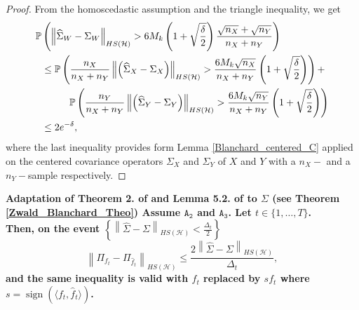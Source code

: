 \documentclass[twoside,11pt]{article}
\newcommand{\HSk}{HS(\mathcal{H})}
\newcommand{\PPO}{\mathbb{P} }
\newcommand{\SW}{\Sigma}
\newcommand{\hS}{\widehat{\Sigma}}
\newcommand{\A}[1]{$\mathtt{A_#1}$}
\DeclareMathOperator{\sign}{sign}
\begin{document}
\begin{proof}
    From the homoscedastic assumption and the triangle inequality, we get 
    \begin{align*}
        \PPO  &\left( \left \| \widehat{\Sigma}_W - \Sigma_W \right \|_{\HSk} > 6 M_k \left( 1 + \sqrt{\frac{\delta}{2}}\right) \frac{\sqrt{n_X} + \sqrt{n_Y}}{n_X + n_Y} \right) \\
        &\leq  \PPO \left( \frac{n_X}{n_X + n_Y} \left \|  \left( \widehat{\Sigma}_{X} - \Sigma_{X} \right) \right \|_{\HSk} > \frac{6 M_k \sqrt{n_X}}{n_X + n_Y} \left( 1 + \sqrt{\frac{\delta}{2}}\right) \right) + \\
        & \hspace{1 cm} \PPO \left( \frac{n_Y}{n_X + n_Y} \left \| \left( \widehat{\Sigma}_{Y} - \Sigma_{Y} \right) \right \|_{\HSk} > \frac{6 M_k \sqrt{n_Y}}{n_X + n_Y} \left( 1 + \sqrt{\frac{\delta}{2}}\right) \right) \\
        &  \leq 2 e^{-\delta},
    \end{align*}
    where the last inequality provides form Lemma \ref{Blanchard_centered_C} applied on the centered covariance operators $\Sigma_{X}$ and $\Sigma_{Y}$ of $X$ and $Y$ with a $n_X-$ and a $n_Y-$sample respectively. 
\end{proof}
\begin{corollary}
	\bf{Adaptation of Theorem 2. of \cite{zwald2005convergence} and Lemma 5.2. of \cite{koltchinskii2000random} to $\SW$ (see Theorem \ref{Zwald_Blanchard_Theo})\rm}
	\normalfont
Assume \A{2} and \A{3}. Let $t \in \{1,\ldots,T\}$. \\
Then, on the event $\left \{\left \| \hS - \SW \right \|_{\HSk} < \frac{\Delta_t}{2} \right\}$ 
$$ \left \| \Pi_{f_t} - \Pi_{\widehat{f}_t} \right \|_{\HSk} \leq \frac{2 \left \| \hS - \SW \right \|_{\HSk}}{\Delta_t} ,$$ 
\label{P_V_theo}
and the same inequality is valid with $f_t$ replaced by $s f_t$ where $s = \sign( \langle f_t, \widehat{f}_t \rangle)$.
\end{corollary}
\end{document}

